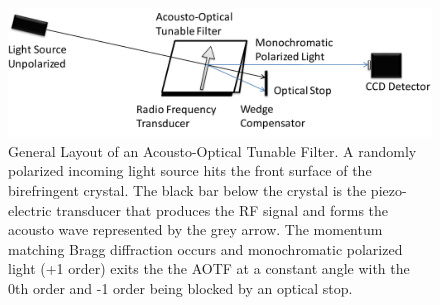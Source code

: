 \begin{figure}[h!]
    \includegraphics[width=1.0\textwidth]{./Images/3-1-AOTFGeneralLayout.pdf}
    \caption[Layout of an AOTF]{General Layout of an Acousto-Optical Tunable Filter. A randomly polarized incoming light source hits the front surface of the birefringent crystal. The black bar below the crystal is the piezo-electric transducer that produces the RF signal and forms the acousto wave represented by the grey arrow. The momentum matching Bragg diffraction occurs and monochromatic polarized light (+1 order) exits the the AOTF at a constant angle with the 0th order and -1 order being blocked by an optical stop.}
    \label{fig:3.1:AOTFLayout}
\end{figure}

